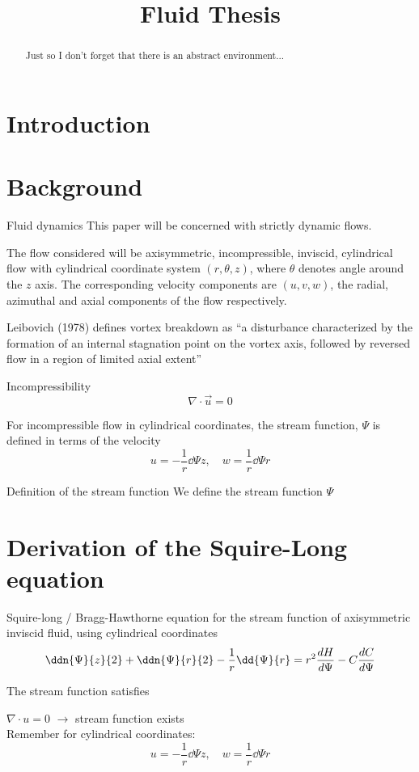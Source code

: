 \documentclass{X:/Documents/Coding/Latex/myreport}
\title{Fluid Thesis}
\begin{document}
\maketitle
\begin{abstract}
    Just so I don't forget that there is an abstract environment...
\end{abstract}
\clearpage
\tableofcontents
\section{Introduction}

\section{Background}
Fluid dynamics 
This paper will be concerned with strictly dynamic flows.


The flow considered will be axisymmetric, incompressible, inviscid, cylindrical flow with cylindrical coordinate system $(r,\theta,z)$, where $\theta$ denotes angle around the $z$ axis. The corresponding velocity components are $(u,v,w)$, the radial, azimuthal and axial components of the flow respectively.


Leibovich (1978) defines vortex breakdown as ``a disturbance characterized
by the formation of an internal stagnation point on the vortex axis, followed by
reversed flow in a region of limited axial extent''

Incompressibility
\[\nabla \cdot \vec u = 0 \]

For incompressible flow in cylindrical coordinates, the stream function, $\Psi$ is defined in terms of the velocity
\[u = -\frac{1}{r} \dd\Psi z, \quad w =  \frac{1}{r} \dd \Psi r\]



Definition of the stream function
We define the stream function $\Psi$ 


\section{Derivation of the Squire-Long equation}
Squire-long / Bragg-Hawthorne equation for the stream function of axisymmetric inviscid fluid, using cylindrical coordinates
\[\ddn{\Psi}{z}{2} + \ddn{\Psi}{r}{2} - \frac1r \dd{\Psi}{r} = r^2 \frac{dH}{d\Psi} - C \frac{dC}{d\Psi}\]

The stream function satisfies

$\nabla \cdot u = 0$ $\longrightarrow$ stream function exists\\
Remember for cylindrical coordinates:
\[u = -\frac1r \dd\Psi{z}, \quad w = \frac1r \dd\Psi{r} \]
\end{document}
